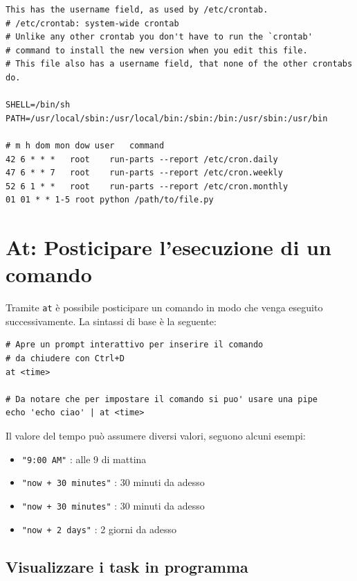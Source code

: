 \documentclass[a4paper]{report}
\newenvironment{code}{\begin{tcolorbox}[size=small]}{\end{tcolorbox}}
\begin{document}
\begin{code}
\begin{lstlisting}
This has the username field, as used by /etc/crontab.
# /etc/crontab: system-wide crontab
# Unlike any other crontab you don't have to run the `crontab'
# command to install the new version when you edit this file.
# This file also has a username field, that none of the other crontabs do.

SHELL=/bin/sh
PATH=/usr/local/sbin:/usr/local/bin:/sbin:/bin:/usr/sbin:/usr/bin

# m h dom mon dow user   command
42 6 * * *   root    run-parts --report /etc/cron.daily
47 6 * * 7   root    run-parts --report /etc/cron.weekly
52 6 1 * *   root    run-parts --report /etc/cron.monthly
01 01 * * 1-5 root python /path/to/file.py
\end{lstlisting}
\end{code}

\chapter{At: Posticipare l'esecuzione di un comando}

Tramite \texttt{at} è possibile posticipare un comando in modo che venga eseguito successivamente.
La sintassi di base è la seguente: 

\begin{code}
\begin{lstlisting}
# Apre un prompt interattivo per inserire il comando
# da chiudere con Ctrl+D
at <time>

# Da notare che per impostare il comando si puo' usare una pipe
echo 'echo ciao' | at <time>
\end{lstlisting}
\end{code}

Il valore del tempo può assumere diversi valori, seguono alcuni esempi:

\begin{itemize}
	\item \texttt{"9:00 AM"}  : alle 9 di mattina
	\item \texttt{"now + 30 minutes"} : 30 minuti da adesso
	\item \texttt{"now + 30 minutes"} : 30 minuti da adesso
	\item \texttt{"now + 2 days"} : 2 giorni da adesso
\end{itemize}

\section{Visualizzare i task in programma}
\end{document}
